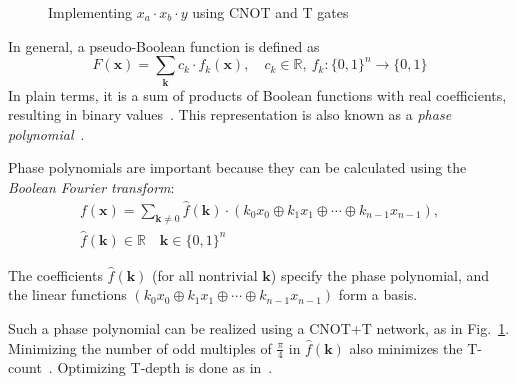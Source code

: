 \documentclass[a4paper]{article}
\begin{document}
\vspace{0.2cm}

\begin{figure}[t]
  \centering
  \scalebox{0.7} {
    
  }
  \caption{Implementing $x_a \cdot x_b \cdot y$ using CNOT and T gates}
  \label{fig-toff-mark}
\end{figure}

\vspace{0.3cm}

In general, a pseudo-Boolean function is defined as
\begin{equation}
  \label{eq-pseudo-boolean}
  F(\mathbf{x}) = \sum_{\mathbf{k}} c_k \cdot f_k(\mathbf{x}), \quad c_k \in \mathbb{R},\ f_k : \{0,1\}^n \to \{0,1\}
\end{equation}
In plain terms, it is a sum of products of Boolean functions with real coefficients, resulting in binary values~\cite{bib-barenco-elementary}. This representation is also known as a {\it phase polynomial}~\cite{bib-amy-cnot}.

\vspace{0.5cm}

Phase polynomials are important because they can be calculated using the {\it Boolean Fourier transform}:
\begin{equation}
  \begin{aligned}
    \label{eq-boolean-fourier}
    f(\mathbf{x}) = \sum_{\mathbf{k} \neq 0} \hat{f}(\mathbf{k}) \cdot ( k_0 x_0 \oplus k_1 x_1 \oplus \cdots \oplus k_{n-1} x_{n-1}), \\\nonumber
    \hat{f}(\mathbf{k}) \in \mathbb{R} \quad \mathbf{k} \in \{0,1\}^{n}
  \end{aligned}
\end{equation}

\vspace{0.3cm}

The coefficients $\hat{f}(\mathbf{k})$ (for all nontrivial $\mathbf{k}$) specify the phase polynomial, and the linear functions $( k_0 x_0 \oplus k_1 x_1 \oplus \cdots \oplus k_{n-1} x_{n-1})$ form a basis.

Such a phase polynomial can be realized using a CNOT+T network, as in Fig.~\ref{fig-toff-mark}. Minimizing the number of odd multiples of $\frac{\pi}{4}$ in $\hat{f}(\mathbf{k})$ also minimizes the T-count~\cite{bib-amy-rm}. Optimizing T-depth is done as in~\cite{bib-amy-matroid}.

\vspace{0.4cm}
\end{document}
